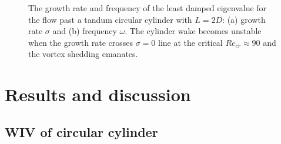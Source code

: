 \begin{figure}
	 \centering
     \caption{The growth rate and frequency of the least damped eigenvalue for the 
                flow past a tandum circular cylinder with $L=2D$: 
                (a) growth rate $\sigma$ and
                (b) frequency $\omega$.  The cylinder wake becomes unstable when 
                the growth rate crosses $\sigma=0$ line at the critical 
                $Re_{cr} \approx 90$ and the vortex shedding emanates. }
\label{fig:fomeig}
\end{figure}



\section{Results and discussion}\label{sec:Results}


\subsection{WIV of circular cylinder}\label{sec:WIV_circular}

